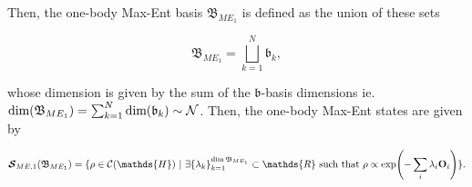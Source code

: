 \documentclass{homework}
\begin{document}
\begin{tcolorbox}[title = N\"aive one-body Max-Ent]
    Then, the one-body Max-Ent basis $\mathfrak{B}_{ME_1}$ is defined as the union of these sets 
    
    $$
        \mathfrak{B}_{ME_1} = \bigsqcup_{k=1}^{N} \mathfrak{b}_k,
    $$
    
    whose dimension is given by the sum of the $\mathfrak{b}$-basis dimensions ie. $\textnormal{dim}(\mathfrak{B}_{ME_1}) = \sum_{k=1}^N \textnormal{dim}(\mathfrak{b}_k) \sim \mathcal{N}$. Then, the one-body Max-Ent states are given by 
    
    \begin{equation}
         \bm{\mathcal{S}}_{ME,1}( \mathfrak{B}_{ME_1}) = \{ \rho \in \mathcal{C}(\mathds{H}) \blanky | \blanky \exists \{\lambda_k\}_{k=1}^{\dim \mathfrak{B}_{ME_1}} \subset \mathds{R}  \textnormal{ such that }  \rho \propto \exp(-\sum_{i}\lambda_i {\bf O}_i) \}.
    \end{equation}
\end{tcolorbox}
\end{document}
